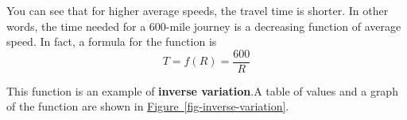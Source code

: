 \documentclass[10pt,]{book}
\newcommand{\terminology}[1]{\textbf{#1}}
\theoremstyle{plain}
\theoremstyle{definition}
\theoremstyle{definition}
\theoremstyle{definition}
\theoremstyle{definition}
\theoremstyle{definition}
\numberwithin{equation}{section}
\newcommand{\hrulethin}  {\noalign{\hrule height 0.04em}}
\newcommand{\hrulethick} {\noalign{\hrule height 0.11em}}
\newcounter{figstack}
\newcounter{figindex}
\newlength\fight
\newcommand\pushValignCaptionBottom[5][b]{%
\stepcounter{figstack}%
\expandafter\def\csname %
figalign\romannumeral\value{figstack}\endcsname{#1}%
\expandafter\def\csname %
figtype\romannumeral\value{figstack}\endcsname{#2}%
\expandafter\def\csname %
figwd\romannumeral\value{figstack}\endcsname{#3}%
\expandafter\def\csname %
figcontent\romannumeral\value{figstack}\endcsname{#4}%
\expandafter\def\csname %
figcap\romannumeral\value{figstack}\endcsname{#5}%
\setbox0=\hbox{%
\begin{#2}{#3}#4\end{#2}}%
\ifdim\dimexpr\ht0+\dp0\relax>\fight\global\setlength{\fight}{%
\dimexpr\ht0+\dp0\relax}\fi%
}
\newcommand\popValignCaptionBottom{%
\setcounter{figindex}{0}%
\hfill%
\whiledo{\value{figindex}<\value{figstack}}{%
\stepcounter{figindex}%
\def\tmp{\csname figwd\romannumeral\value{figindex}\endcsname}%
\begin{\csname figtype\romannumeral\value{figindex}\endcsname}[t]{\tmp}%
\centering%
\stackinset{c}{}%
{\csname figalign\romannumeral\value{figindex}\endcsname}{}%
{\csname figcontent\romannumeral\value{figindex}\endcsname}%
{\rule{0pt}{\fight}}\par%
\csname figcap\romannumeral\value{figindex}\endcsname%
\end{\csname figtype\romannumeral\value{figindex}\endcsname}%
\hfill%
}%
\setcounter{figstack}{0}%
\setlength{\fight}{0pt}%
\hfill%
}
\begin{document}
	You can see that for higher average speeds, the travel time is shorter. In other words, the time needed for a \(600\)-mile journey is a decreasing function of average speed. In fact, a formula for the function is
	\begin{equation*}T = f (R) = \frac{600}{R}\end{equation*}
%
\par

	This function is an example of \terminology{inverse variation}.A table of values and a graph of the function are shown in \hyperref[fig-inverse-variation]{Figure~\ref{fig-inverse-variation}}.
%
\leavevmode%
\typeout{************************************************}
\typeout{************************************************}
\end{document}

